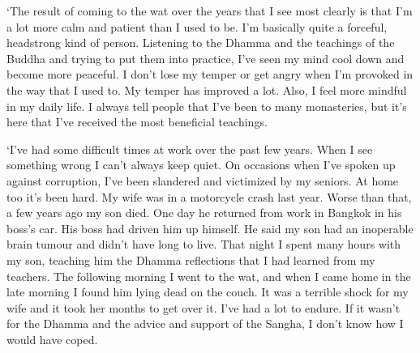 `The result of coming to the wat over the years that I see most clearly
is that I'm a lot more calm and patient than I used to be. I'm
basically quite a forceful, headstrong kind of person. Listening to the
Dhamma and the teachings of the Buddha and trying to put them into
practice, I've seen my mind cool down and become more peaceful. I don't
lose my temper or get angry when I'm provoked in the way that I used to. 
My temper has improved a lot. Also, I feel more mindful in my daily
life. I always tell people that I've been to many monasteries, but it's
here that I've received the most beneficial teachings. 

`I've had some difficult times at work over the past few years. When I
see something wrong I can't always keep quiet. On occasions when I've
spoken up against corruption, I've been slandered and victimized by my
seniors. At home too it's been hard. My wife was in a motorcycle crash
last year. Worse than that, a few years ago my son died. One day he
returned from work in Bangkok in his boss's car. His boss had driven him
up himself. He said my son had an inoperable brain tumour and didn't
have long to live. That night I spent many hours with my son, teaching
him the Dhamma reflections that I had learned from my teachers. The
following morning I went to the wat, and when I came home in the late
morning I found him lying dead on the couch. It was a terrible shock for
my wife and it took her months to get over it. I've had a lot to endure. 
If it wasn't for the Dhamma and the advice and support of the Sangha, I
don't know how I would have coped. 

